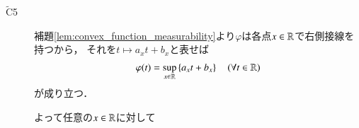 \begin{prf}
\begin{description}
			\item[$\tilde{\mathrm{C}}$5]
				補題\ref{lem:convex_function_measurability}より$\varphi$は各点$x \in \mathbb{R}$で右側接線を持つから，
				それを$t \longmapsto a_x t + b_x$と表せば
				\begin{align}
					\varphi(t) = \operatorname*{sup}_{x \in \mathbb{R}} \left\{ a_x t + b_x \right\} \quad (\forall t \in \mathbb{R})
					\label{eq:prp_properties_of_expanded_conditional_expectation_1}
				\end{align}
				が成り立つ．
				\begin{comment}
				実際或る点$x_0 \in \R$で
				\begin{align}
					\varphi(x_0) > \epsilon \coloneqq \sup{r \in \Q}{\left\{ a_r x_0 + b_r \right\}}
					\label{eq:prp_properties_of_expanded_conditional_expectation_2}
				\end{align}
				が成り立つとする．
				任意に$\delta_1 > 0$を取り
				\begin{align}
					\alpha \coloneqq \left| a_{x_0 - \delta_1} \right| \vee \left| a_{x_0 + \delta_1} \right|
				\end{align}
				とおけば，(\refeq{ineq:lem:convex_function_measurability_1})より$x \longmapsto a_x$は単調非減少であるから，
				$|x_0 - r| < \delta_1$を満たす$r \in \Q$に対し
				\begin{align}
					|a_r| \leq \alpha
				\end{align}
				が成り立つ．また$\varphi$の連続性より或る$\delta_2 > 0$が存在して，$|x_0 - r| < \delta_2$となる限り
				\begin{align}
					\left| \varphi(x_0) - \varphi(r) \right| < \frac{\epsilon}{2}
				\end{align}
				が満たされる．従って
				\begin{align}
					\delta_3 \coloneqq \delta_1 \wedge \delta_2 \wedge \frac{\epsilon}{2 \alpha}\ \footnotemark
				\end{align}
				\footnotetext{
					$\alpha = 0$の場合は$\delta_3 = \delta_1 \wedge \delta_2$とおけばよい．
				}
				とおけば，$|x_0 - r| < \delta_3$を満たす$r \in \Q$に対して
				\begin{align}
					\left| \varphi(x_0) - \left( a_r x_0 + b_r \right) \right| 
					\leq \left| \varphi(x_0) - \varphi(r) \right| + |a_r| \left| x_0 - r \right| < \epsilon
				\end{align}
				となり(\refeq{eq:prp_properties_of_expanded_conditional_expectation_2})に矛盾する．
				\end{comment}
				よって任意の$x \in \mathbb{R}$に対して
				\begin{align}

\end{align}
\end{description}
\end{prf}
